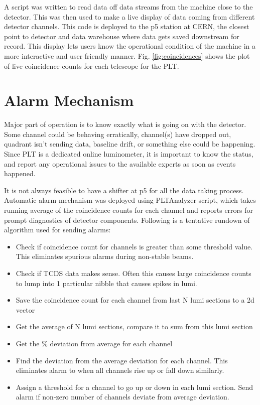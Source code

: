 A script was written to read data off data streams from the machine close to the detector. This was then used to make a live display of data coming from different detector channels. This code is deployed to the p5 station at CERN, the closest point to detector and data warehouse where data gets saved downstream for record. This display lets users know the operational condition of the machine in a more interactive and user friendly manner. Fig. \ref{fig:coincidences} shows the plot of live coincidence counts for each telescope for the PLT.




\section{Alarm Mechanism} \label{sec:Alarm}
Major part of operation is to know exactly what is going on with the detector. Some channel could be behaving erratically, channel(s) have dropped out, quadrant isn't sending data, baseline drift, or something else could be happening. Since PLT is a dedicated online luminometer, it is important to know the status, and report any operational issues to the available experts as soon as events happened.

It is not always feasible to have a shifter at p5 for all the data taking process. Automatic alarm mechanism was deployed using PLTAnalyzer script, which takes running average of the coincidence counts for each channel and reports errors for prompt diagnostics of detector components. Following is a tentative rundown of algorithm used for sending alarms:



\begin{itemize}
	\item Check if coincidence count for channels is greater than some threshold value. This eliminates spurious alarms during non-stable beams.
	\item Check if TCDS data makes sense. Often this causes large coincidence counts to lump into 1 particular nibble that causes spikes in lumi.
	\item Save the coincidence count for each channel from last N lumi sections to a 2d vector
	\item Get the average of N lumi sections, compare it to sum from this lumi section
	\item Get the \% deviation from average for each channel
	\item Find the deviation from the average deviation for each channel. This eliminates alarm to when all channels rise up or fall down similarly.
	\item Assign a threshold for a channel to go up or down in each lumi section. Send alarm if non-zero number of channels deviate from average deviation.
\end{itemize}
		
